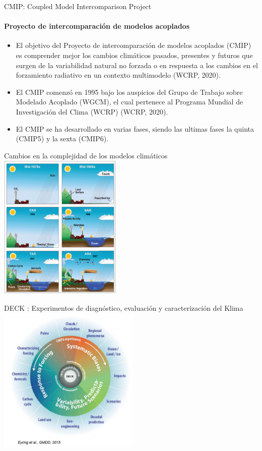 \documentclass{beamer}
\begin{document}
\begin{frame} {CMIP: Coupled Model Intercomparison Project}
\framesubtitle {Proyecto de intercomparación de modelos acoplados}
\begin{itemize}
	\setlength\itemsep{1em} 
	\item El objetivo del Proyecto de intercomparación de modelos acoplados (CMIP) es comprender mejor los cambios climáticos pasados, presentes y futuros que surgen de la variabilidad natural no forzada o en respuesta a los cambios en el forzamiento radiativo en un contexto multimodelo (WCRP, 2020). 
	\item El CMIP comenzó en 1995 bajo los auspicios del Grupo de Trabajo sobre Modelado Acoplado (WGCM), el cual pertenece al Programa Mundial de Investigación del Clima (WCRP) (WCRP, 2020). 
	\item El CMIP se ha desarrollado en varias fases, siendo las ultimas fases la quinta (CMIP5) y la sexta (CMIP6). 		
	\end{itemize}
	
\end{frame}

\begin{frame}{Cambios en la complejidad de los modelos climáticos}
\includegraphics[height=7cm]{img/modelhist.png}
\centering
\end{frame}	
	
\begin{frame}{DECK : Experimentos de diagnóstico, evaluación y caracterización del Klima}
\includegraphics[height=7cm]{img/mips.png}
\centering
\end{frame}	
	
\end{document}

